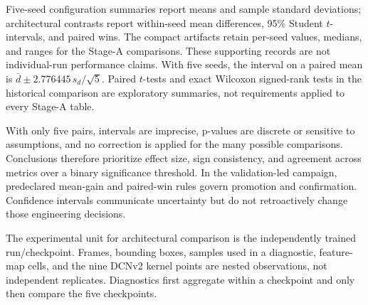Five-seed configuration summaries report means and sample standard deviations;
architectural contrasts report within-seed mean differences, 95\% Student
\(t\)-intervals, and paired wins. The compact artifacts retain per-seed values,
medians, and ranges for the Stage-A comparisons. These supporting records are
not individual-run performance claims. With five seeds, the interval on a
paired mean is \(\bar d \pm 2.776445\,s_d/\sqrt{5}\).
Paired \(t\)-tests and exact Wilcoxon signed-rank tests in the historical
comparison are exploratory summaries, not requirements applied to every
Stage-A table.

With only five pairs, intervals are imprecise, p-values are discrete or
sensitive to assumptions, and no correction is applied for the many possible
comparisons. Conclusions therefore prioritize effect size, sign consistency,
and agreement across metrics over a binary significance threshold. In the
validation-led campaign, predeclared mean-gain and paired-win rules govern
promotion and confirmation. Confidence intervals communicate uncertainty but
do not retroactively change those engineering decisions.

The experimental unit for architectural comparison is the independently
trained run/checkpoint. Frames, bounding boxes, samples used in a diagnostic,
feature-map cells, and the nine DCNv2 kernel points are nested observations,
not independent replicates. Diagnostics first aggregate within a checkpoint
and only then compare the five checkpoints.
